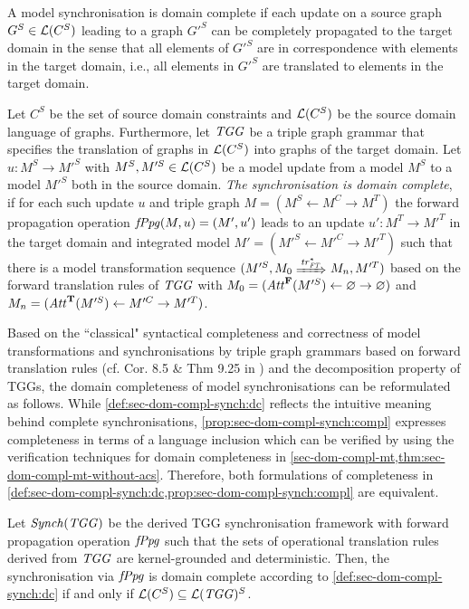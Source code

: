 A model synchronisation is domain complete if each update on a source graph $G^S \in \mathcal{L}(C^S)$ leading to a graph $G'^S$ can be completely propagated to the target domain in the sense that all elements of $G'^S$ are in correspondence with elements in the target domain, i.e., all elements in $G'^S$ are translated to elements in the target domain.

\begin{definition}
\label{def:sec-dom-compl-synch:dc}
Let $C^S$ be the set of source domain constraints and $\mathcal{L}(C^S)$ be the source domain language of graphs. 
Furthermore, let $\mathit{TGG}$ be a triple graph grammar that specifies the translation of graphs in $\mathcal{L}(C^S)$ into graphs of the target domain.
Let $u\colon M^S \to M'^S$ with $M^S,M'^S \in \mathcal{L}(C^S)$ be a model update from a model $M^S$ to a model $M'^S$ both in the source domain.
\emph{The synchronisation is domain complete}, if for each such update $u$ and triple graph $M=(M^S \gets M^C \to M^T)$ the forward propagation operation $\mathit{fPpg}(M,u)=(M',u')$ leads to an update $u'\colon M^T \to M'^T$ in the target domain and integrated model $M'=(M'^S \gets M'^C \to M'^T)$ such that there is a model transformation sequence $(M'^S,M_0 \Trans{\tr^*_\FT} M_n,M'^T)$ based on the forward translation rules of $\mathit{TGG}$ with $M_0=(\mathit{Att}^\mathbf{F}(M'^S) \gets \varnothing \to \varnothing)$ and $M_n=(\mathit{Att}^\mathbf{T}(M'^S) \gets M'^C \to M'^T)$.
\envEndMarker
\end{definition}

Based on the ``classical" syntactical completeness and correctness of model transformations and synchronisations by triple graph grammars based on forward translation rules (cf. Cor. 8.5 \& Thm 9.25 in \cite{FAGT2}) and the decomposition property of TGGs, the domain completeness of model synchronisations can be reformulated as follows.
While \cref{def:sec-dom-compl-synch:dc} reflects the intuitive meaning behind complete synchronisations, \cref{prop:sec-dom-compl-synch:compl} expresses completeness in terms of a language inclusion which can be verified by using the verification techniques for domain completeness in \cref{sec-dom-compl-mt,thm:sec-dom-compl-mt-without-acs}.
Therefore, both formulations of completeness in \cref{def:sec-dom-compl-synch:dc,prop:sec-dom-compl-synch:compl} are equivalent.

\begin{theorem}
\label{prop:sec-dom-compl-synch:compl}
Let $\mathit{Synch}(\mathit{TGG})$ be the derived TGG synchronisation framework with forward propagation operation $\mathit{fPpg}$ such that the sets of operational translation rules derived from $\mathit{TGG}$ are kernel-grounded and deterministic.
Then, the synchronisation via $\mathit{fPpg}$ is domain complete according to \cref{def:sec-dom-compl-synch:dc} if and only if $\mathcal{L}(C^S) \subseteq \mathcal{L}(\mathit{TGG})^S$.
\envEndMarker
\end{theorem}

